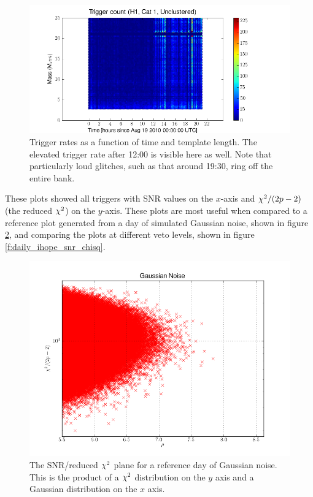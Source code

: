 \begin{figure}
  \includegraphics[width=\linewidth]{figures/detchar/H1_1_UNCLUSTERED_hexmass}
  \caption[Trigger rates as a function of time and template length]{
  \label{f:daily_ihope_time_mass}
Trigger rates as a function of time and template length.  The elevated
trigger rate after 12:00 is visible here as well.  Note that
particularly loud glitches, such as that around 19:30, ring off the
entire bank.
}
\end{figure}%



These plots showed all triggers with SNR values on the $x$-axis and
$\chi^2 / (2p-2)$ (the reduced $\chisq$) on the $y$-axis.  These plots
are most useful when compared to a reference plot generated from a day
of simulated Gaussian noise, shown in figure
\ref{f:gaussian_snr_chisq}, and comparing the plots at different veto
levels, shown in figure \ref{f:daily_ihope_snr_chisq}.

\begin{figure}
\includegraphics[width=0.85\linewidth]{figures/detchar/GAUSSIAN_0_UNCLUSTERED_chisq.png}
\caption[SNR/reduced $\chisq$ values in Gaussian noise]{
\label{f:gaussian_snr_chisq}
The SNR/reduced $\chisq$ plane for a reference day of
Gaussian noise.  This is the product of a $\chisq$ distribution on the
$y$ axis and a Gaussian distribution on the $x$ axis.}
\end{figure}%

